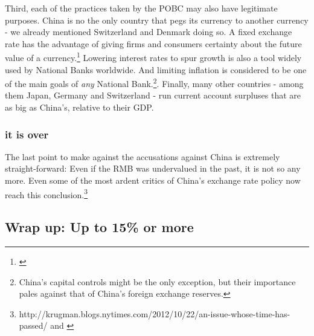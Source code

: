 \documentclass[11pt]{article}
\begin{document}
Third, each of the practices taken by the POBC may also have legitimate purposes. China is no the only country that pegs its currency to another currency - we already mentioned Switzerland and Denmark doing so. A fixed exchange rate has the advantage of giving firms and consumers certainty about the future value of a currency.\footnote{\cite[p. 515]{Krugman2008}} Lowering interest rates to spur growth is also a tool widely used by National Banks worldwide. And limiting inflation is considered to be one of the main goals of \emph{any} National Bank.\footnote{China's capital controls might be the only exception, but their importance pales against that of China's foreign exchange reserves.}. Finally, many other countries - among them Japan, Germany and Switzerland - run current account surpluses that are as big as China's, relative to their GDP.


\subsubsection{it is over}

The last point to make against the accusations against China is extremely straight-forward: Even if the RMB was undervalued in the past, it is not so any more. Even some of the most ardent critics of China's exchange rate policy now reach this conclusion.\footnote{\cite{Krugman2012}http://krugman.blogs.nytimes.com/2012/10/22/an-issue-whose-time-has-passed/ and \cite{ClineWilliamson2012}} %



\subsection{Wrap up: Up to 15\% or more}


\end{document}
